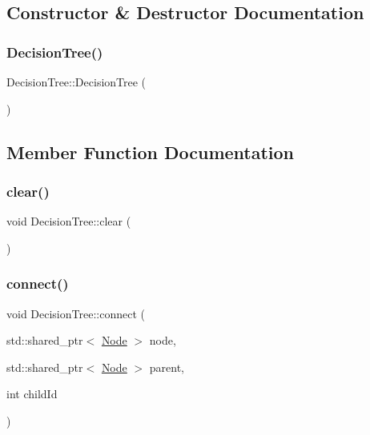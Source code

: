 \subsection{Constructor \& Destructor Documentation}
\mbox{\label{classdtree_1_1_decision_tree_a470fba8e51d63ec23701050de3f06647}} 
\subsubsection{\texorpdfstring{DecisionTree()}{DecisionTree()}}
{\footnotesize\ttfamily Decision\+Tree\+::\+Decision\+Tree (\begin{DoxyParamCaption}{ }\end{DoxyParamCaption})}



\subsection{Member Function Documentation}
\mbox{\label{classdtree_1_1_decision_tree_aced396943cf79577905a2d7ae0e0e5c1}} 
\subsubsection{\texorpdfstring{clear()}{clear()}}
{\footnotesize\ttfamily void Decision\+Tree\+::clear (\begin{DoxyParamCaption}{ }\end{DoxyParamCaption})}

\mbox{\label{classdtree_1_1_decision_tree_a6b7eda36962c2c659a198b01a8557531}} 
\subsubsection{\texorpdfstring{connect()}{connect()}}
{\footnotesize\ttfamily void Decision\+Tree\+::connect (\begin{DoxyParamCaption}\item[{std\+::shared\+\_\+ptr$<$ \mbox{\hyperlink{classdtree_1_1_node}{Node}} $>$}]{node,  }\item[{std\+::shared\+\_\+ptr$<$ \mbox{\hyperlink{classdtree_1_1_node}{Node}} $>$}]{parent,  }\item[{int}]{child\+Id }\end{DoxyParamCaption})}

